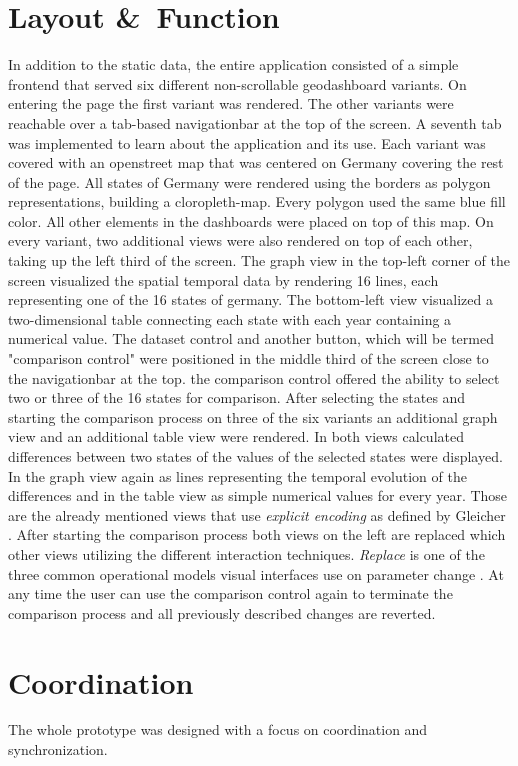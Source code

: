 \section{Layout \&\ Function}
In addition to the static data, the entire application consisted of a simple frontend that served six different non-scrollable
geodashboard variants. On entering the page the first variant was rendered. The other variants were reachable over a
tab-based navigationbar at the top of the screen. A seventh tab was implemented to learn about the application and its use.
Each variant was covered with an openstreet map that was centered on Germany covering the rest of the page. All states of
Germany were rendered using the borders as polygon representations, building a cloropleth-map. Every polygon used the same
blue fill color. All other elements in the dashboards were placed on top of this map. On every variant, two additional views
were also rendered on top of each other, taking up the left third of the screen. The graph view in the top-left corner of the
screen visualized the spatial temporal data by rendering 16 lines, each representing one of the 16 states of germany. The
bottom-left view visualized a two-dimensional table connecting each state with each year containing a numerical value. The
dataset control and another button, which will be termed "comparison control" were positioned in the middle third of the
screen close to the navigationbar at the top. the comparison control offered the ability to select two or three of the 16
states for comparison. After selecting the states and starting the comparison process on three of the six variants an additional
graph view and an additional table view were rendered. In both views calculated differences between two states of the values
of the selected states were displayed. In the graph view again as lines representing the temporal evolution of the differences
and in the table view as simple numerical values for every year. Those are the already mentioned views that use
\textit{explicit encoding} as defined by Gleicher \citep*{Gleicher.2018}. After starting the comparison process both views
on the left are replaced which other views utilizing the different interaction techniques. \textit{Replace} is one of the
three common operational models visual interfaces use on parameter change \citep*{Costabile.2004, Roberts.2008}. At any time the user can
use the comparison control again to terminate the comparison process and all previously described changes are reverted.
\section{Coordination}
The whole prototype was designed with a focus on coordination and synchronization. 

